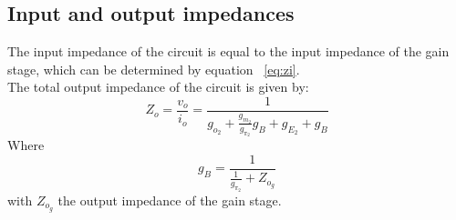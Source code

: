 \subsection{Input and output impedances}
The input impedance of the circuit is equal to the input impedance of the gain stage, which can be determined by equation ~\ref{eq:zi}. \\
The total output impedance of the circuit is given by:
\begin{equation}
    Z_o =\frac{v_o}{i_o} =\frac{1}{g_{o_2}+\frac{g_{m_2}}{g_{\pi_2}}g_B+g_{E_2}+g_B}
\end{equation}
Where 
\begin{equation}
    g_B=\frac{1}{\frac{1}{g_{\pi_2}}+Z_{o_g}}
\end{equation}
with $Z_{o_g}$ the output impedance of the gain stage.

